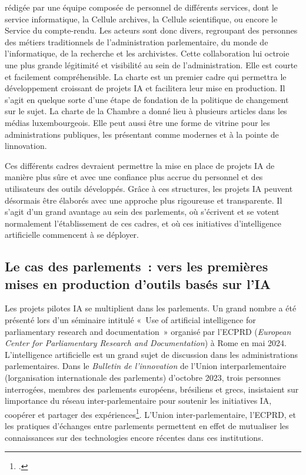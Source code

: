 rédigée par une équipe composée de personnel de différents services,
dont le service informatique, la Cellule archives, la Cellule scientifique, ou encore le Service du compte-rendu.
Les acteurs sont donc divers, regroupant des personnes des métiers
traditionnels de l'administration parlementaire, du monde de
l'informatique, de la recherche et les archivistes. Cette collaboration
lui octroie une plus grande légitimité et visibilité
au sein de l'administration. Elle est courte et facilement
compréhensible. La charte est un premier cadre qui permettra le
développement croissant de projets IA et facilitera leur mise en
production. Il s'agit en quelque sorte d'une étape de fondation de la
politique de \gls{changement} sur le sujet. La charte de la
Chambre a donné lieu à plusieurs articles dans les médias
luxembourgeois. Elle peut aussi être une forme de vitrine pour les
administrations publiques, les présentant comme modernes et à la pointe
de l\textquotesingle innovation.

Ces différents cadres devraient permettre la mise en place de projets IA
de manière plus sûre et avec une confiance plus accrue du personnel et
des utilisateurs des outils développés. Grâce à ces structures, les
projets IA peuvent désormais être élaborés avec une approche plus
rigoureuse et transparente. Il s'agit d'un grand avantage au sein des
parlements, où s'écrivent et se votent normalement l'établissement de
ces cadres, et où ces initiatives d'intelligence artificielle commencent
à se déployer.


\subsection{Le cas des parlements~: vers les premières mises en production d'outils basés sur l'IA}

Les projets pilotes IA se multiplient dans les parlements. Un grand
nombre a été présenté lors d'un séminaire intitulé «~Use of artificial
intelligence for parliamentary research and documentation~» organisé par
l'ECPRD (\emph{European Center for Parliamentary Research and
	Documentation}) à Rome en mai 2024. L'intelligence artificielle est un
grand sujet de discussion dans les administrations parlementaires. Dans
le \emph{Bulletin de l'innovation} de l'Union interparlementaire
(l\textquotesingle organisation internationale des parlements) d'octobre
2023, trois personnes interrogées, membres des parlements européens,
brésiliens et grecs, insistaient sur l\textquotesingle importance du
réseau inter-parlementaire pour soutenir les initiatives IA, coopérer et
partager des expériences\footcite{noauthor_innovation_nodate}. L'Union inter-parlementaire, l'ECPRD, et les
pratiques d'échanges entre parlements permettent en effet de mutualiser
les connaissances sur des technologies encore récentes dans ces
institutions. 

